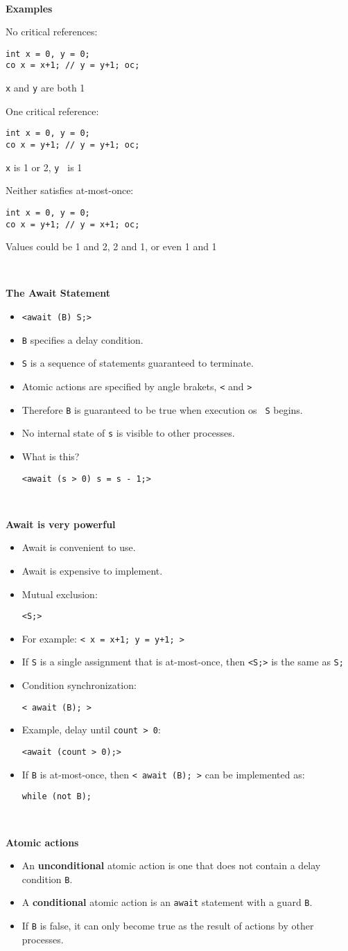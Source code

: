 \documentclass{article}
\newcommand{\bi}{\begin{itemize}}
\newcommand{\ii}{\item}
\newcommand{\ei}{\end{itemize}}
\newcommand{\ti}[1]{
\mbox{~}

\vspace{1.25in}
\centerline{\bf #1}}
\begin{document}
\newpage
\ti{Examples}
No critical references:
\begin{verbatim}
int x = 0, y = 0;
co x = x+1; // y = y+1; oc;
\end{verbatim}
{\tt x} and {\tt y} are both 1

\vspace{1in}

One critical reference:
\begin{verbatim}
int x = 0, y = 0;
co x = y+1; // y = y+1; oc;
\end{verbatim}
{\tt x} is 1 or 2, {\tt y } is 1

\vspace{1in}

Neither satisfies at-most-once:
\begin{verbatim}
int x = 0, y = 0;
co x = y+1; // y = x+1; oc;
\end{verbatim}
Values could be 1 and 2, 2 and 1, or even 1 and 1

\newpage
\ti{The Await Statement}

\bi
\ii {\tt <await (B) S;>}
\ii {\tt B} specifies a delay condition.
\ii {\tt S} is a sequence of statements guaranteed to terminate.
\ii Atomic actions are specified by angle brakets, {\tt <} and {\tt >}
\ii Therefore {\tt B} is guaranteed to be true when execution os {\tt
  S} begins.
\ii No internal state of {\tt s} is visible to other processes.
\ii What is this?

\centerline {\tt <await (s > 0) s = s - 1;>}
\ei

\newpage
\ti{Await is very powerful}
\bi
\ii Await is convenient to use.
\ii Await is expensive to implement.
\ii Mutual exclusion:

\centerline{\tt <S;>}

\ii For example:  {\tt < x = x+1; y = y+1; > }
\ii If {\tt S} is a single assignment that is at-most-once, then {\tt <S;>}
is the same as {\tt S;}
\ii Condition synchronization:

\centerline{\tt < await (B); >}

\ii Example, delay until {\tt count > 0}:

\centerline{\tt <await (count > 0);>}

\ii If {\tt B} is at-most-once, then {\tt < await (B); >} can be
implemented as:

\centerline{\tt while (not B);}
\ei

\newpage
\ti{Atomic actions}
\bi
\ii An {\bf unconditional} atomic action is one that does not contain
a delay condition {\tt B}.
\ii A {\bf conditional} atomic action is an {\tt await} statement with
a guard {\tt B}.  
\ii If {\tt B} is false, it can only become true as the result of
actions by other processes.
\ei
\end{document}

